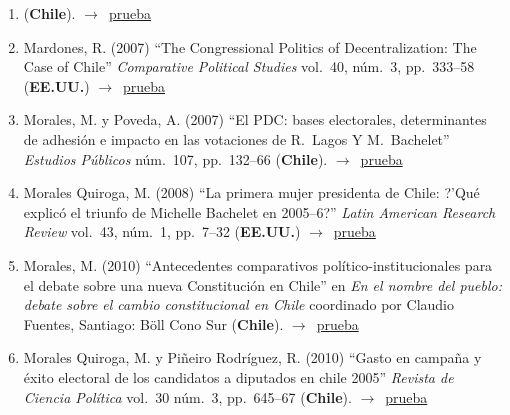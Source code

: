 \documentclass[12 pt, letter]{article}
\newenvironment{CitasMiTrabajo}{
    \begin{footnotesize}
    \begin{enumerate}[label={\footnotesize\emph{cita~\arabic*}},ref=\arabic*] %
        \setlength{\itemsep}{.1\itemsep}
        \setlength{\parskip}{.1\parskip}
    }{\end{enumerate}\end{footnotesize}}
\begin{document}
\begin{CitasMiTrabajo}
        \item {} (\textbf{Chile}). $\rightarrow$~\href{https://scielo.conicyt.cl/scielo.php?pid=S0718-090X2019000100099&script=sci_arttext}{prueba}
          
        \item Mardones, R. (2007)
        ``The Congressional Politics of Decentralization: The Case of Chile'' \emph{Comparative
        Political Studies} vol.\ 40, n\'um.\ 3, pp.\ 333--58  (\textbf{EE.UU.}) $\rightarrow$~\href{https://github.com/emagar/cv/blob/master/citasMiTrab/mrs/mardones.pdf}{prueba}

        \item Morales, M. y Poveda, A. (2007)
        ``El PDC: bases electorales, determinantes de adhesi\'on e impacto en las votaciones de R.\ Lagos Y M.\ Bachelet''
        \emph{Estudios P\'ublicos} n\'um.\ 107, pp.\ 132--66  (\textbf{Chile}). $\rightarrow$~\href{https://github.com/emagar/cv/blob/master/citasMiTrab/mrs/morales+povedapdcbases.pdf}{prueba}

        \item Morales Quiroga, M. (2008)
        ``La primera mujer presidenta de Chile: ?'Qu\'e explic\'o el triunfo de Michelle Bachelet en 2005--6?''
        \emph{Latin American Research Review} vol.\ 43, n\'um.\ 1, pp.\ 7--32 (\textbf{EE.UU.}) $\rightarrow$~\href{https://github.com/emagar/cv/blob/master/citasMiTrab/mrs/morales2008larr.excerpt.pdf}{prueba}

        \item Morales, M. (2010)
        ``Antecedentes comparativos pol\'itico-institucionales para el debate sobre una nueva Constituci\'on en Chile''
        en \emph{En el nombre del pueblo: debate sobre el cambio constitucional en Chile} coordinado por Claudio Fuentes, Santiago: B\"oll Cono Sur (\textbf{Chile}). $\rightarrow$~\href{https://github.com/emagar/cv/blob/master/citasMiTrab/mrs/morales2010.excerpt.pdf}{prueba}

        \item Morales Quiroga, M. y Pi\~neiro Rodr\'iguez, R. (2010)
        ``Gasto en campa\~na y \'exito electoral de los candidatos a diputados en chile 2005''
        \emph{Revista de Ciencia Pol\'itica} vol.\ 30 n\'um.\ 3, pp.\ 645--67 (\textbf{Chile}). $\rightarrow$~\href{https://github.com/emagar/cv/blob/master/citasMiTrab/mrs/moralesPineiro2010rcp.pdf}{prueba}


\end{CitasMiTrabajo}
\end{document}

